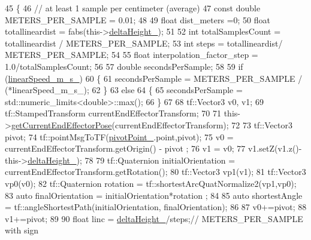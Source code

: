 \begin{DoxyCode}
45     \{
46         \textcolor{comment}{// at least 1 sample per centimeter (average)        }
47         \textcolor{keyword}{const} \textcolor{keywordtype}{double} METERS\_PER\_SAMPLE = 0.01;
48 
49         \textcolor{keywordtype}{float} dist\_meters =0;
50         \textcolor{keywordtype}{float} totallineardist = fabs(this->\hyperlink{classcl__move__group__interface_1_1CbCircularPouringMotion_a7009d617bcd8ac1fba49100444434f3c}{deltaHeight\_});
51 
52         \textcolor{keywordtype}{int} totalSamplesCount = totallineardist / METERS\_PER\_SAMPLE;
53         \textcolor{keywordtype}{int} steps = totallineardist/ METERS\_PER\_SAMPLE;
54 
55         \textcolor{keywordtype}{float} interpolation\_factor\_step = 1.0/totalSamplesCount;
56 
57         \textcolor{keywordtype}{double} secondsPerSample;
58 
59         \textcolor{keywordflow}{if} (\hyperlink{classcl__move__group__interface_1_1CbCircularPouringMotion_ac78ce543451cbb78c95862dd4273deb7}{linearSpeed\_m\_s\_})
60         \{
61             secondsPerSample = METERS\_PER\_SAMPLE / (*linearSpeed\_m\_s\_);
62         \}
63         \textcolor{keywordflow}{else}
64         \{
65             secondsPerSample = std::numeric\_limits<double>::max();
66         \}
67 
68         tf::Vector3 v0, v1;
69         tf::StampedTransform currentEndEffectorTransform;
70 
71         this->\hyperlink{classcl__move__group__interface_1_1CbCircularPouringMotion_a0cc72cc5233ecb0c264621d4d9501b30}{getCurrentEndEffectorPose}(currentEndEffectorTransform);
72 
73         tf::Vector3 pivot;
74         tf::pointMsgToTF(\hyperlink{classcl__move__group__interface_1_1CbCircularPouringMotion_a4c100d8ba3e57f7ddfb614017d115fca}{pivotPoint\_}.point,pivot);
75         v0 = currentEndEffectorTransform.getOrigin() - pivot ;
76         v1 = v0;
77         v1.setZ(v1.z()- this->\hyperlink{classcl__move__group__interface_1_1CbCircularPouringMotion_a7009d617bcd8ac1fba49100444434f3c}{deltaHeight\_});
78 
79         tf::Quaternion initialOrientation = currentEndEffectorTransform.getRotation();
80         tf::Vector3 vp1(v1);
81         tf::Vector3 vp0(v0);
82         tf::Quaternion rotation = tf::shortestArcQuatNormalize2(vp1,vp0);
83         \textcolor{keyword}{auto} finalOrientation = initialOrientation*rotation ;
84 
85         \textcolor{keyword}{auto} shortestAngle = tf::angleShortestPath(initialOrientation, finalOrientation);
86 
87         v0+=pivot;
88         v1+=pivot;
89         
90         \textcolor{keywordtype}{float} linc = \hyperlink{classcl__move__group__interface_1_1CbCircularPouringMotion_a7009d617bcd8ac1fba49100444434f3c}{deltaHeight\_}/steps;\textcolor{comment}{// METERS\_PER\_SAMPLE with sign}

\end{DoxyCode}
